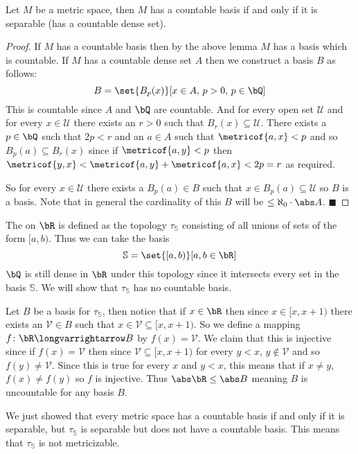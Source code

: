 \documentclass[10pt]{article}
\def\qed{\hskip1cm\penalty-100\hbox{}\hfill$\blacksquare$}
\def\bS{\mathbb{S}}
\def\mU{\mathcal{U}}
\def\mV{\mathcal{V}}
\def\longto{\longvarrightarrow}
\begin{document}
\begin{thrm*}

    Let $M$ be a metric space, then $M$ has a countable basis if and only if it is separable (has a countable dense set).

\end{thrm*}

\begin{proof}

    If $M$ has a countable basis then by the above lemma $M$ has a basis which is countable.
    If $M$ has a countable dense set $A$ then we construct a basis $B$ as follows:
    \[ B = \set{B_p(x)}[x\in A,\, p>0,\, p\in\bQ] \]
    This is countable since $A$ and $\bQ$ are countable.
    And for every open set $\mU$ and for every $x\in\mU$ there exists an $r>0$ such that $B_r(x)\subseteq\mU$.
    There exists a $p\in\bQ$ such that $2p<r$ and an $a\in A$ such that $\metricof{a,x}<p$ and so $B_p(a)\subseteq B_r(x)$ since if $\metricof{a,y}<p$ then
    $\metricof{y,x}<\metricof{a,y}+\metricof{a,x}<2p=r$ as required.

    So for every $x\in\mU$ there exists a $B_p(a)\in B$ such that $x\in B_p(a)\subseteq\mU$ so $B$ is a basis.
    Note that in general the cardinality of this $B$ will be $\leq\aleph_0\cdot\abs A$.
    \qed

\end{proof}

\begin{exam*}

    The  on $\bR$ is defined as the topology $\tau_\bS$ consisting of all unions of sets of the form $[a,b)$.
    Thus we can take the basis
    \[ \bS = \set{[a,b)}[a,b\in\bR] \]
    $\bQ$ is still dense in $\bR$ under this topology since it intersects every set in the basis $\bS$.
    We will show that $\tau_\bS$ has no countable basis.

    Let $B$ be a basis for $\tau_\bS$, then notice that if $x\in\bR$ then since $x\in[x,x+1)$ there exists an $\mV\in B$ such that $x\in\mV\subseteq[x,x+1)$.
    So we define a mapping $f\colon\bR\longto B$ by $f(x)=\mV$.
    We claim that this is injective since if $f(x)=\mV$ then since $\mV\subseteq[x,x+1)$ for every $y<x$, $y\notin\mV$ and so $f(y)\neq\mV$.
    Since this is true for every $x$ and $y<x$, this means that if $x\neq y$, $f(x)\neq f(y)$ so $f$ is injective.
    Thus $\abs\bR\leq\abs B$ meaning $B$ is uncountable for any basis $B$.

    We just showed that every metric space has a countable basis if and only if it is separable, but $\tau_\bS$ is separable but does not have a countable basis.
    This means that $\tau_\bS$ is not metricizable.

\end{exam*}
\end{document}
